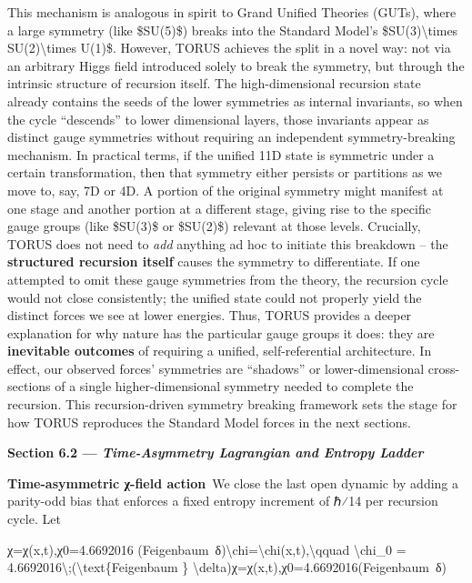 \documentclass[
]{article}
\begin{document}
{This mechanism is analogous in spirit to Grand Unified Theories (GUTs),
where a large symmetry (like \$SU(5)\$) breaks into the Standard Model's
\$SU(3)\textbackslash times SU(2)\textbackslash times U(1)\$. However,
TORUS achieves the split in a novel way: not via an arbitrary Higgs
field introduced solely to break the symmetry, but through the intrinsic
structure of recursion itself\hspace{0pt}. The high-dimensional
recursion state already contains the seeds of the lower symmetries as
internal invariants, so when the cycle ``descends'' to lower dimensional
layers, those invariants appear as distinct gauge symmetries without
requiring an independent symmetry-breaking mechanism\hspace{0pt}. In
practical terms, if the unified 11D state is symmetric under a certain
transformation, then that symmetry either persists or partitions as we
move to, say, 7D or 4D. A portion of the original symmetry might
manifest at one stage and another portion at a different stage, giving
rise to the specific gauge groups (like \$SU(3)\$ or \$SU(2)\$) relevant
at those levels\hspace{0pt}. Crucially, TORUS does not need to
\emph{add} anything ad hoc to initiate this breakdown -- the
\textbf{structured recursion itself} causes the symmetry to
differentiate. If one attempted to omit these gauge symmetries from the
theory, the recursion cycle would not close consistently; the unified
state could not properly yield the distinct forces we see at lower
energies\hspace{0pt}. Thus, TORUS provides a deeper explanation for why
nature has the particular gauge groups it does: they are
\textbf{inevitable outcomes} of requiring a unified, self-referential
architecture. In effect, our observed forces' symmetries are ``shadows''
or lower-dimensional cross-sections of a single higher-dimensional
symmetry needed to complete the recursion\hspace{0pt}. This
recursion-driven symmetry breaking framework sets the stage for how
TORUS reproduces the Standard Model forces in the next sections.

\textbf{Section 6.2 --- \emph{Time-Asymmetry Lagrangian and Entropy
Ladder}}

\textbf{Time-asymmetric χ-field action} We close the last open dynamic
by adding a parity-odd bias that enforces a fixed entropy increment of
ℏ⁄14 per recursion cycle. Let

χ=χ(x,t),χ0=4.6692016  (Feigenbaum~δ)\textbackslash chi=\textbackslash chi(x,t),\textbackslash qquad
\textbackslash chi\_0 =
4.6692016\textbackslash;(\textbackslash text\{Feigenbaum \}
\textbackslash delta)χ=χ(x,t),χ0\hspace{0pt}=4.6692016(Feigenbaum~δ)

}
\end{document}
